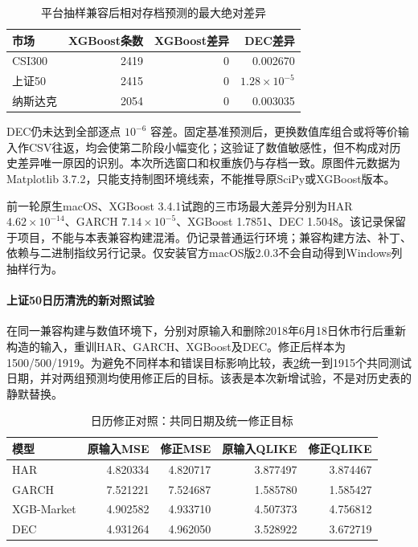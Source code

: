 \begin{table}[htbp]\centering\caption{平台抽样兼容后相对存档预测的最大绝对差异}\label{tab:reproduction_difference}
\begin{tabular}{lrrr}\toprule 市场 & XGBoost条数 & XGBoost差异 & DEC差异\\\midrule
CSI300 & 2419 & 0 & 0.002670\\
上证50 & 2415 & 0 & \(1.28\times10^{-5}\)\\
纳斯达克 & 2054 & 0 & 0.003035\\\bottomrule\end{tabular}\end{table}

DEC仍未达到全部逐点 $10^{-6}$ 容差。固定基准预测后，更换数值库组合或将等价输入作CSV往返，均会使第二阶段小幅变化；这验证了数值敏感性，但不构成对历史差异唯一原因的识别。本次所选窗口和权重族仍与存档一致。原图件元数据为Matplotlib 3.7.2，只能支持制图环境线索，不能推导原SciPy或XGBoost版本。

前一轮原生macOS、XGBoost 3.4.1试跑的三市场最大差异分别为HAR $4.62\times10^{-14}$、GARCH $7.14\times10^{-5}$、XGBoost 1.7851、DEC 1.5048。该记录保留于项目，不能与本表兼容构建混淆。仍记录普通运行环境；兼容构建方法、补丁、依赖与二进制指纹另行记录。仅安装官方macOS版2.0.3不会自动得到Windows列抽样行为。

\paragraph{上证50日历清洗的新对照试验}
在同一兼容构建与数值环境下，分别对原输入和删除2018年6月18日休市行后重新构造的输入，重训HAR、GARCH、XGBoost及DEC。修正后样本为1500/500/1919。为避免不同样本和错误目标影响比较，表\ref{tab:calendar_sensitivity}统一到1915个共同测试日期，并对两组预测均使用修正后的目标。该表是本次新增试验，不是对历史表的静默替换。

\begin{table}[htbp]\centering\caption{日历修正对照：共同日期及统一修正目标}\label{tab:calendar_sensitivity}
\begin{tabular}{lrrrr}\toprule
模型 & 原输入MSE & 修正MSE & 原输入QLIKE & 修正QLIKE\\\midrule
HAR & 4.820334 & 4.820717 & 3.877497 & 3.874467\\
GARCH & 7.521221 & 7.524687 & 1.585780 & 1.585427\\
XGB-Market & 4.902582 & 4.933710 & 4.507373 & 4.756812\\
DEC & 4.931264 & 4.962050 & 3.528922 & 3.672719\\
\bottomrule\end{tabular}\end{table}

